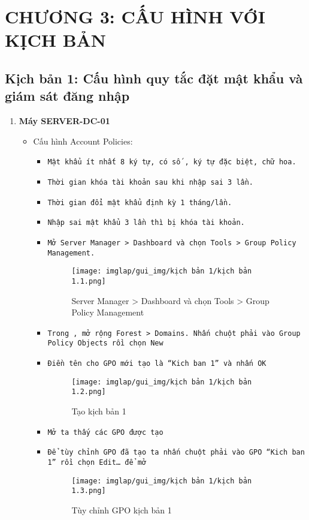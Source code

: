 \documentclass[13pt]{article}
\begin{document}
	\section{CHƯƠNG 3: CẤU HÌNH VỚI KỊCH BẢN }
	
        \subsection{Kịch bản 1: Cấu hình quy tắc đặt mật khẩu và giám sát đăng nhập}
		\begin{enumerate}
                \item \textbf{Máy SERVER-DC-01}
                \begin{itemize}
                    \item Cấu hình Account Policies:
                        \sloppy
                        \begin{itemize}
    \item \texttt{Mật khẩu ít nhất 8 ký tự, có số , ký tự đặc biệt, chữ hoa.}
    \item \texttt{Thời gian khóa tài khoản sau khi nhập sai 3 lần.}
    \item \texttt{Thời gian đổi mật khẩu định kỳ 1 tháng/lần.}
    \item \texttt{Nhập sai mật khẩu 3 lần thì bị khóa tài khoản.}
    \item \texttt{Mở Server Manager > Dashboard và chọn Tools > Group Policy Management.}
    \begin{figure}[H]
        \centering
        \texttt{[image: imglap/gui\_img/kịch bản 1/kịch bản 1.1.png]}
        \caption{Server Manager > Dashboard và chọn Tools > Group Policy Management}
        \label{fig:enter-label}
    \end{figure}
        
\newpage
        \item \texttt{Trong }\textbf{}\texttt{, mở rộng Forest > Domains. Nhấn chuột phải vào Group Policy Objects rồi chọn New}
        \item \texttt{Điền tên cho GPO mới tạo là “Kich ban 1” và nhấn OK}

        \begin{figure}[H]
            \centering
            \texttt{[image: imglap/gui\_img/kịch bản 1/kịch bản 1.2.png]}
            \caption{Tạo kịch bản 1}
            \label{fig:enter-label}
        \end{figure}
\newpage
        \item \texttt{Mở }\textbf{}\texttt{ta thấy các GPO được tạo}
        \item \texttt{Để tùy chỉnh GPO đã tạo ta nhấn chuột phải vào GPO “Kich ban 1” rồi chọn Edit… để mở}\textbf{}
        \begin{figure}[H]
            \centering
            \texttt{[image: imglap/gui\_img/kịch bản 1/kịch bản 1.3.png]}
            \caption{Tùy chỉnh GPO kịch bản 1}
            \label{fig:enter-label}
        \end{figure}


\end{itemize}
\end{itemize}
\end{enumerate}
\end{document}
